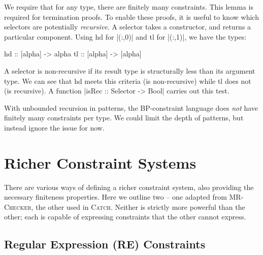 \documentclass[preprint]{sigplanconf}
\newcommand{\C}[1]{\textsf{#1}}
\newcommand{\catch}{\textsc{Catch}}
\newcommand{\newtool}{\anon{\catch07}{\catch}}
\newcommand{\oldtool}{\anon{\catch05}{\textsc{MR-Checker}}}
\newcommand{\anon}[2]{#2}
\begin{document}
We require that for any type, there are finitely many constraints. This lemma is required for termination proofs. To enable these proofs, it is useful to know which selectors are potentially \textit{recursive}. A selector takes a constructor, and returns a particular component. Using \C{hd} for |(:,0)| and \C{tl} for |(:,1)|, we have the types:

\begin{code}
hd  :: [alpha] -> alpha
tl  :: [alpha] -> [alpha]
\end{code}

A selector is non-recursive if its result type is structurally less than its argument type. We can see that \C{hd} meets this criteria (is non-recursive) while \C{tl} does not (is recursive). A function |isRec :: Selector -> Bool| carries out this test.

With unbounded recursion in patterns, the BP-constraint language does \textit{not} have finitely many constraints per type. We could limit the depth of patterns, but instead ignore the issue for now.

\section{Richer Constraint Systems}
\label{sec:constraint}

There are various ways of defining a richer constraint system, also providing the necessary finiteness properties. Here we outline two -- one adapted from \oldtool{}, the other used in \newtool{}. Neither is strictly more powerful than the other; each is capable of expressing constraints that the other cannot express.

\subsection{Regular Expression (RE) Constraints}
\label{sec:regexp}
\end{document}
